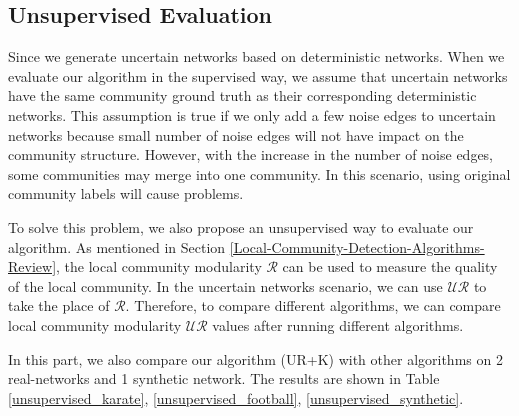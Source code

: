 \documentclass[\main/thesis.tex]{subfiles}
\begin{document}

\subsection*{Unsupervised Evaluation}
Since we generate uncertain networks based on deterministic networks. When we evaluate our algorithm in the supervised way, we assume that uncertain networks have the same community ground truth as their corresponding deterministic networks. This assumption is true if we only add a few noise edges to uncertain networks because small number of noise edges will not have impact on the community structure. However, with the increase in the number of noise edges, some communities may merge into one community. In this scenario, using original community labels will cause problems.

To solve this problem, we also propose an unsupervised way to evaluate our algorithm. As mentioned in Section \ref{Local-Community-Detection-Algorithms-Review}, the local community modularity $\mathcal{R}$ can be used to measure the quality of the local community. In the uncertain networks scenario, we can use $\mathcal{UR}$ to take the place of $\mathcal{R}$. Therefore, to compare different algorithms, we can compare local community modularity $\mathcal{UR}$ values after running different algorithms.

In this part, we also compare our algorithm (UR+K) with other algorithms on 2 real-networks and 1 synthetic network. The results are shown in Table \ref{unsupervised_karate}, \ref{unsupervised_football}, \ref{unsupervised_synthetic}.
\end{document}
